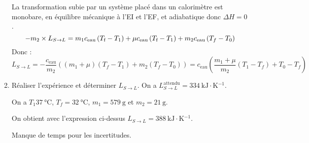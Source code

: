 \documentclass[a4paper,french,bookmarks]{article}
\begin{document}
\begin{enumerate}[resume]
{        La transformation subie par un système placé dans un calorimètre est monobare, en équilibre mécanique à l'EI et l'EF, et adiabatique donc $\Delta H = 0$.
        \[ -m_2\times L_{S \to L} = m_1c_\text{eau}\left(T_\text f - T_1\right) + \mu c_\text{eau}\left(T_\text f - T_1\right) + m_2c_\text{eau}\left(T_f - T_0\right)\]
        Donc :
        \[ L_{S \to L} = -\dfrac{c_\text{eau}}{m_2}\left(\left(m_1 + \mu\right)\left(T_f - T_1\right) + m_2\left(T_f - T_0\right)\right) = c_\text{eau}\left(\dfrac{m_1 + \mu}{m_2}\left(T_1 - T_f\right) + T_0 - T_f\right)\]
    }
    
    \item Réaliser l'expérience et déterminer $L_{S \to L}$. On a $L_{S \to L}^\text{attendu} = \SI{334}{\kilo\joule \cdot \kelvin^{-1}}$.
    
    \begin{expcom} \text{}
        \begin{enumerate}
            \itt On a $T_1 \SI{37}{\celsius}$, $T_f = \SI{32}{\celsius}$, $m_1 = \SI{579}{\g}$ et $m_2 = \SI{21}{\g}$.
            
            \itt On obtient avec l'expression ci-dessus $L_{S \to L} = \SI{388}{\kilo\joule \cdot \kelvin^{-1}}$.
            
            \itt Manque de temps pour les incertitudes.
        \end{enumerate}
    \end{expcom}
    
\end{enumerate}
\end{document}
